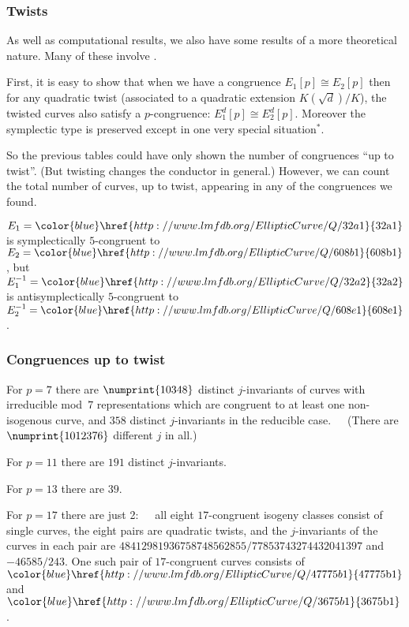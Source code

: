 \documentclass[handout]{beamer}
\newcommand{\lmfdbec}[3]{\color{blue}\href{http://www.lmfdb.org/EllipticCurve/Q/#1#2#3}{{\text{\rm#1#2#3}}}}
\newcommand{\high}[1]{\emph{\color{blue}{#1}}}
\begin{document}
\begin{frame}\frametitle{Twists}
As well as computational results, we also have some results of a
more theoretical nature.  Many of these involve \high{twists}.

\pause\medskip
First, it is easy to show that when we have a congruence $E_1[p]\cong
E_2[p]$ then for any quadratic twist (associated to a quadratic
extension $K(\sqrt{d})/K$), the twisted curves also satisfy a
$p$-congruence: $E_1^d[p]\cong E_2^d[p]$.  Moreover the symplectic
type is preserved except in one very special situation${}^*$.

\pause\medskip
So the previous tables could have only shown the number of congruences
``up to twist''.  (But twisting changes the conductor in general.)
However, we can count the total number of curves, up to twist,
appearing in any of the congruences we found.

\pause\medskip
\begin{example}[${}^*$]
$E_1=\lmfdbec{32}{a}{1}$ is symplectically $5$-congruent to
$E_2=\lmfdbec{608}{b}{1}$, but $E_1^{-1}=\lmfdbec{32}{a}{2}$ is
antisymplectically $5$-congruent to $E_2^{-1}=\lmfdbec{608}{e}{1}$.
\end{example}
\end{frame}

\begin{frame}\frametitle{Congruences up to twist}
For $p=7$ there are $\numprint{10348}$ distinct $j$-invariants of
curves with irreducible mod~$7$ representations which are congruent to
at least one non-isogenous curve, and $358$ distinct $j$-invariants in
the reducible case.\pause\ \ \   (There are $\numprint{1012376}$ different $j$ in
all.)

\pause\medskip
For $p=11$ there are $191$ distinct $j$-invariants.

For $p=13$ there are $39$.

For $p=17$ there are just 2:\ \ \ \pause all eight $17$-congruent isogeny
classes consist of single curves, the eight pairs are quadratic
twists, and the $j$-invariants of the curves in each pair are
$48412981936758748562855/77853743274432041397$ and $-46585/243$.  One
such pair of $17$-congruent curves consists of $\lmfdbec{47775}{b}{1}$
and~$\lmfdbec{3675}{b}{1}$.

\end{frame}
\end{document}
